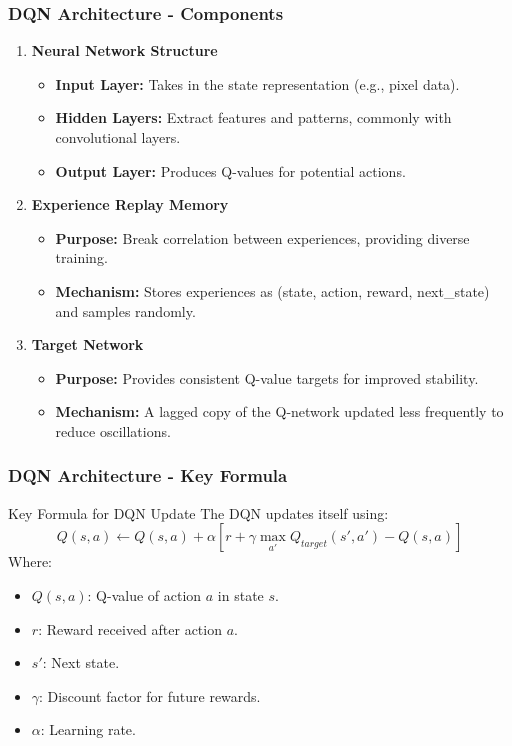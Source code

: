 \documentclass{beamer}
\begin{document}
\begin{frame}[fragile]
    \frametitle{DQN Architecture - Components}
    \begin{enumerate}
        \item \textbf{Neural Network Structure}
        \begin{itemize}
            \item \textbf{Input Layer:} Takes in the state representation (e.g., pixel data).
            \item \textbf{Hidden Layers:} Extract features and patterns, commonly with convolutional layers.
            \item \textbf{Output Layer:} Produces Q-values for potential actions.
        \end{itemize}

        \item \textbf{Experience Replay Memory}
        \begin{itemize}
            \item \textbf{Purpose:} Break correlation between experiences, providing diverse training.
            \item \textbf{Mechanism:} Stores experiences as (state, action, reward, next\_state) and samples randomly.
        \end{itemize}
        
        \item \textbf{Target Network}
        \begin{itemize}
            \item \textbf{Purpose:} Provides consistent Q-value targets for improved stability.
            \item \textbf{Mechanism:} A lagged copy of the Q-network updated less frequently to reduce oscillations.
        \end{itemize}
    \end{enumerate}
\end{frame}

\begin{frame}[fragile]
    \frametitle{DQN Architecture - Key Formula}
    \begin{block}{Key Formula for DQN Update}
        The DQN updates itself using:
        \begin{equation}
            Q(s, a) \leftarrow Q(s, a) + \alpha \left[ r + \gamma \max_{a'} Q_{target}(s', a') - Q(s, a) \right]
        \end{equation}
        Where:
        \begin{itemize}
            \item $Q(s, a)$: Q-value of action $a$ in state $s$.
            \item $r$: Reward received after action $a$.
            \item $s'$: Next state.
            \item $\gamma$: Discount factor for future rewards.
            \item $\alpha$: Learning rate.
        \end{itemize}
    \end{block}
\end{frame}
\end{document}
